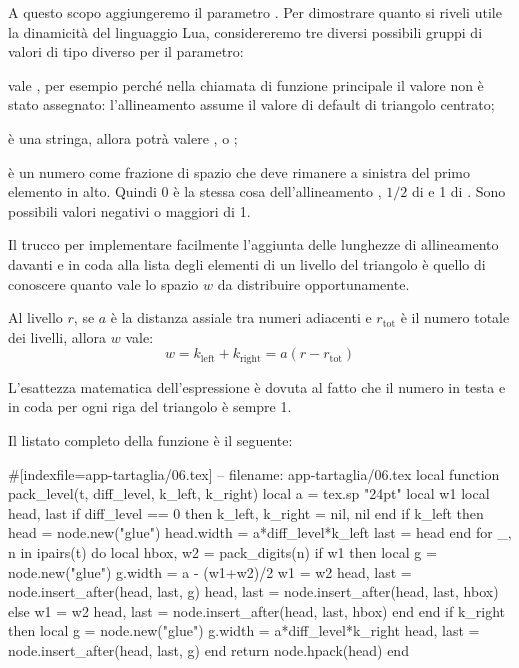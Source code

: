 A questo scopo aggiungeremo il parametro . Per dimostrare quanto si
riveli utile la dinamicità del linguaggio Lua, considereremo tre diversi
possibili gruppi di valori di tipo diverso per il parametro:
\begin{compactitemize}
\item {} vale , per esempio perché nella chiamata di funzione
principale il valore non è stato assegnato: l'allineamento assume il valore di
default di triangolo centrato;
\item {} è una stringa, allora potrà valere ,
 o ;
\item {} è un numero come frazione di spazio che deve rimanere a
sinistra del primo elemento in alto. Quindi 0 è la stessa cosa dell'allineamento
, \( 1/2 \) di  e 1 di . Sono
possibili valori negativi o maggiori di 1.
\end{compactitemize}

Il trucco per implementare facilmente l'aggiunta delle lunghezze di allineamento
davanti e in coda alla lista degli elementi di un livello del triangolo è quello
di conoscere quanto vale lo spazio \( w \) da distribuire opportunamente.

Al livello \( r \), se \( a \) è la distanza assiale tra numeri adiacenti e \(
r_\mathrm{tot} \) è il numero totale dei livelli, allora \( w \) vale:
\[
w = k_\mathrm{left} + k_\mathrm{right} = a\left(r - r_\mathrm{tot}\right)
\]

L'esattezza matematica dell'espressione è dovuta al fatto che il numero in testa
e in coda per ogni riga del triangolo è sempre 1.

Il listato completo della funzione  è il seguente:
\begin{lines}
#[indexfile=app-tartaglia/06.tex]
-- filename: app-tartaglia/06.tex
local function pack_level(t, diff_level, k_left, k_right)
    local a = tex.sp "24pt"
    local w1
    local head, last
    if diff_level == 0 then
        k_left, k_right = nil, nil
    end
    if k_left then
        head = node.new("glue")
        head.width = a*diff_level*k_left
        last = head
    end
    for _, n in ipairs(t) do
        local hbox, w2 = pack_digits(n)
        if w1 then
            local g = node.new("glue")
            g.width = a - (w1+w2)/2
            w1 = w2
            head, last = node.insert_after(head, last, g)
            head, last = node.insert_after(head, last, hbox)
        else
            w1 = w2
            head, last = node.insert_after(head, last, hbox)
        end
    end
    if k_right then
        local g = node.new("glue")
        g.width = a*diff_level*k_right
        head, last = node.insert_after(head, last, g)
    end
    return node.hpack(head)
end
\end{lines}

